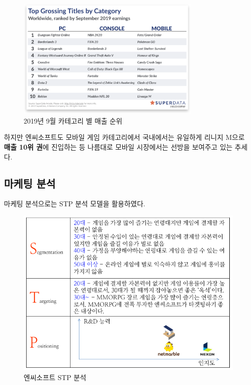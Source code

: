 \documentclass[11pt]{oblivoir}
\begin{document}
		\begin{figure}[htbp]
			\centering
			\includegraphics[width=0.8\textwidth]{Pictures/septemberMaechul.png}
			\caption{2019년 9월 카테고리 별 매출 순위}
		\end{figure}
	
		하지만 엔씨소프트도 모바일 게임 카테고리에서 국내에서는 유일하게 리니지 M으로 \textbf{매출 10위 권}에 진입하는 등 나름대로 모바일 시장에서는 선방을 보여주고 있는 추세다. 
			  
		\subsection{마케팅 분석}
		마케팅 분석으로는 STP 분석 모델을 활용하였다.
		\begin{figure}[htbp]
			\centering
			\includegraphics[width=1\textwidth]{Pictures/STP.png}
			\caption{엔씨소프트 STP 분석}
		\end{figure}
		\newpage
		
\end{document}
